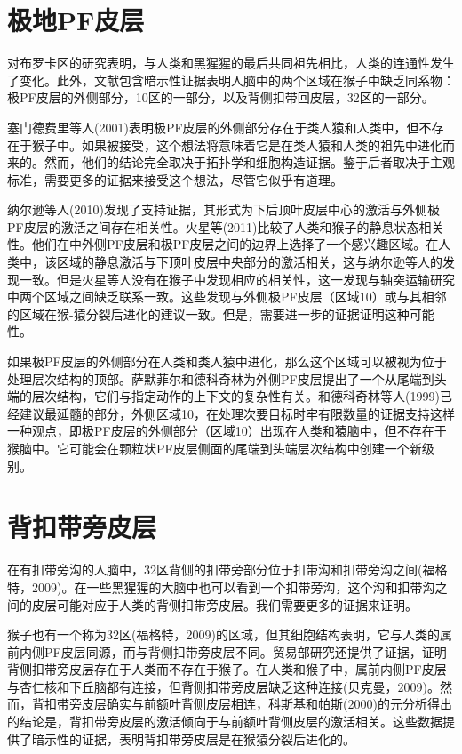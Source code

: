 \section{极地PF皮层}
对布罗卡区的研究表明，与人类和黑猩猩的最后共同祖先相比，人类的连通性发生了变化。此外，文献包含暗示性证据表明人脑中的两个区域在猴子中缺乏同系物：极PF皮层的外侧部分，10区的一部分，以及背侧扣带回皮层，32区的一部分。
\par
塞门德费里等人(2001)表明极PF皮层的外侧部分存在于类人猿和人类中，但不存在于猴子中。如果被接受，这个想法将意味着它是在类人猿和人类的祖先中进化而来的。然而，他们的结论完全取决于拓扑学和细胞构造证据。鉴于后者取决于主观标准，需要更多的证据来接受这个想法，尽管它似乎有道理。
\par
纳尔逊等人(2010)发现了支持证据，其形式为下后顶叶皮层中心的激活与外侧极PF皮层的激活之间存在相关性。火星等(2011)比较了人类和猴子的静息状态相关性。他们在中外侧PF皮层和极PF皮层之间的边界上选择了一个感兴趣区域。在人类中，该区域的静息激活与下顶叶皮层中央部分的激活相关，这与纳尔逊等人的发现一致。但是火星等人没有在猴子中发现相应的相关性，这一发现与轴突运输研究中两个区域之间缺乏联系一致。这些发现与外侧极PF皮层（区域10）或与其相邻的区域在猴-猿分裂后进化的建议一致。但是，需要进一步的证据证明这种可能性。
\par
如果极PF皮层的外侧部分在人类和类人猿中进化，那么这个区域可以被视为位于处理层次结构的顶部。萨默菲尔和德科奇林为外侧PF皮层提出了一个从尾端到头端的层次结构，它们与指定动作的上下文的复杂性有关。和德科奇林等人(1999)已经建议最延髓的部分，外侧区域10，在处理次要目标时牢有限数量的证据支持这样一种观点，即极PF皮层的外侧部分（区域10）出现在人类和猿脑中，但不存在于猴脑中。它可能会在颗粒状PF皮层侧面的尾端到头端层次结构中创建一个新级别。
\section{背扣带旁皮层}
在有扣带旁沟的人脑中，32区背侧的扣带旁部分位于扣带沟和扣带旁沟之间(福格特，2009)。在一些黑猩猩的大脑中也可以看到一个扣带旁沟，这个沟和扣带沟之间的皮层可能对应于人类的背侧扣带旁皮层。我们需要更多的证据来证明。
\par
猴子也有一个称为32区(福格特，2009)的区域，但其细胞结构表明，它与人类的属前内侧PF皮层同源，而与背侧扣带旁皮层不同。贸易部研究还提供了证据，证明背侧扣带旁皮层存在于人类而不存在于猴子。在人类和猴子中，属前内侧PF皮层与杏仁核和下丘脑都有连接，但背侧扣带旁皮层缺乏这种连接(贝克曼，2009)。然而，背扣带旁皮层确实与前额叶背侧皮层相连，科斯基和帕斯(2000)的元分析得出的结论是，背扣带旁皮层的激活倾向于与前额叶背侧皮层的激活相关。这些数据提供了暗示性的证据，表明背扣带旁皮层是在猴猿分裂后进化的。

